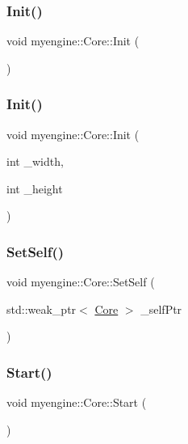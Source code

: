 \subsubsection{\texorpdfstring{Init()}{Init()}\hspace{0.1cm}{\footnotesize\ttfamily [1/2]}}
{\footnotesize\ttfamily void myengine\+::\+Core\+::\+Init (\begin{DoxyParamCaption}{ }\end{DoxyParamCaption})}

\mbox{\label{classmyengine_1_1_core_ac7ce6b74d6b0228a1b5125ec3373e8b0}} 
\subsubsection{\texorpdfstring{Init()}{Init()}\hspace{0.1cm}{\footnotesize\ttfamily [2/2]}}
{\footnotesize\ttfamily void myengine\+::\+Core\+::\+Init (\begin{DoxyParamCaption}\item[{int}]{\+\_\+width,  }\item[{int}]{\+\_\+height }\end{DoxyParamCaption})}

\mbox{\label{classmyengine_1_1_core_a250805a435bee8689d7f9bd44c8e7f79}} 
\subsubsection{\texorpdfstring{Set\+Self()}{SetSelf()}}
{\footnotesize\ttfamily void myengine\+::\+Core\+::\+Set\+Self (\begin{DoxyParamCaption}\item[{std\+::weak\+\_\+ptr$<$ \hyperlink{classmyengine_1_1_core}{Core} $>$}]{\+\_\+self\+Ptr }\end{DoxyParamCaption})}

\mbox{\label{classmyengine_1_1_core_a15a52e8674f890144428059b80cf1330}} 
\subsubsection{\texorpdfstring{Start()}{Start()}}
{\footnotesize\ttfamily void myengine\+::\+Core\+::\+Start (\begin{DoxyParamCaption}{ }\end{DoxyParamCaption})}

